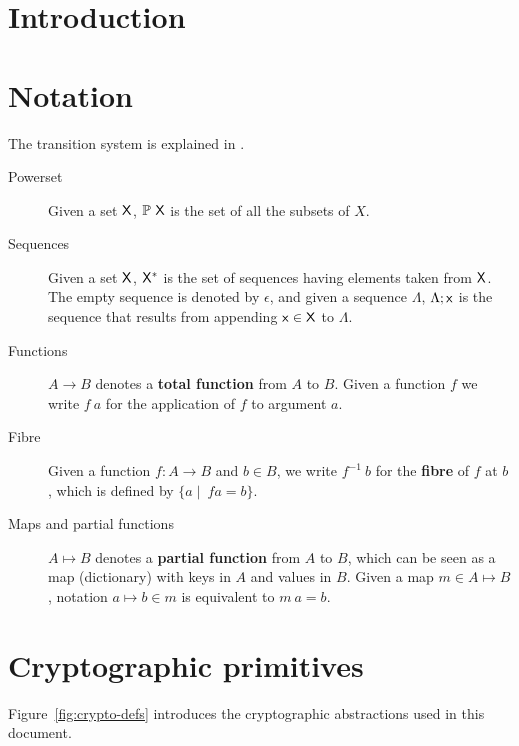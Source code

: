 \documentclass[11pt,a4paper]{article}
\theoremstyle{definition}
\theoremstyle{definition}
\begin{document}


\tableofcontents
\listoffigures

\section{Introduction}
\label{sec:introduction}


\section{Notation}\label{sec:notation}

The transition system is explained in \cite{small_step_semantics}.

\begin{description}
\item[Powerset] Given a set $\mathsf{X}$, $\mathbb{P}~\mathsf{X}$ is the set of all
  the subsets of $X$.
\item[Sequences] Given a set $\mathsf{X}$, $\mathsf{X}^{*}$ is the set of
  sequences having elements taken from $\mathsf{X}$. The empty sequence is
  denoted by $\epsilon$, and given a sequence $\Lambda$, $\Lambda; \mathsf{x}$ is
  the sequence that results from appending $\mathsf{x} \in \mathsf{X}$ to
  $\Lambda$.
\item[Functions] $A \to B$ denotes a \textbf{total function} from $A$ to $B$.
  Given a function $f$ we write $f~a$ for the application of $f$ to argument
  $a$.
\item[Fibre] Given a function $f: A \to B$ and $b\in B$, we write
  $f^{-1}~b$ for the \textbf{fibre} of $f$ at $b$, which is defined by
  $\{a \mid\ f a =  b\}$.
\item[Maps and partial functions] $A \mapsto B$ denotes a \textbf{partial
    function} from $A$ to $B$, which can be seen as a map (dictionary) with
  keys in $A$ and values in $B$. Given a map $m \in A \mapsto B$, notation
  $a \mapsto b \in m$ is equivalent to $m~ a = b$.
\end{description}

\section{Cryptographic primitives}
\label{sec:crypto-primitives}

Figure~\ref{fig:crypto-defs} introduces the cryptographic abstractions used in
this document.
\end{document}
